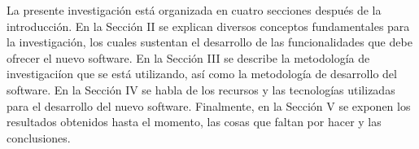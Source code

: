 \documentclass[conference]{IEEEtran}
\begin{document}
La presente investigaci\'{o}n est\'{a} organizada en cuatro secciones despu\'{e}s de la introducci\'{o}n. En la Secci\'{o}n II se explican diversos conceptos fundamentales para la investigaci\'{o}n, los cuales sustentan el desarrollo de las funcionalidades que debe ofrecer el nuevo software. En la Secci\'{o}n III se describe la metodolog\'{i}a de investigaci\'{i}on que se est\'{a} utilizando, as\'{i} como la metodolog\'{i}a de desarrollo del software. En la Secci\'{o}n IV se habla de los recursos y las tecnolog\'{i}as utilizadas para el desarrollo del nuevo software. Finalmente, en la Secci\'{o}n V se exponen los resultados obtenidos hasta el momento, las cosas que faltan por hacer y las conclusiones.


%
%



%
%
\end{document}
